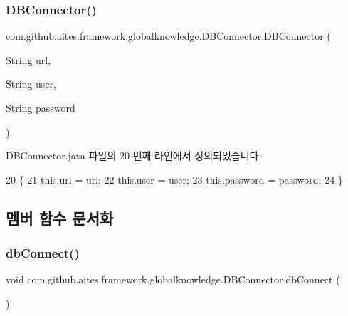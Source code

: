 \subsubsection{\texorpdfstring{D\+B\+Connector()}{DBConnector()}\hspace{0.1cm}{\footnotesize\ttfamily [3/3]}}
{\footnotesize\ttfamily com.\+github.\+aites.\+framework.\+globalknowledge.\+D\+B\+Connector.\+D\+B\+Connector (\begin{DoxyParamCaption}\item[{String}]{url,  }\item[{String}]{user,  }\item[{String}]{password }\end{DoxyParamCaption})}



D\+B\+Connector.\+java 파일의 20 번째 라인에서 정의되었습니다.


\begin{DoxyCode}
20                                                                 \{
21         this.url = url;
22         this.user = user;
23         this.password = password;
24     \}
\end{DoxyCode}


\subsection{멤버 함수 문서화}
\mbox{\label{classcom_1_1github_1_1aites_1_1framework_1_1globalknowledge_1_1_d_b_connector_a108808207e33b613b470855bb2be9223}} 
\subsubsection{\texorpdfstring{db\+Connect()}{dbConnect()}}
{\footnotesize\ttfamily void com.\+github.\+aites.\+framework.\+globalknowledge.\+D\+B\+Connector.\+db\+Connect (\begin{DoxyParamCaption}{ }\end{DoxyParamCaption})}



